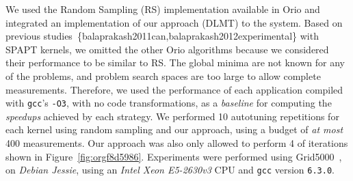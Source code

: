 \documentclass[conference]{IEEEtran}
\begin{document}
We used the Random Sampling (RS) implementation available in Orio and integrated
an implementation of our approach (DLMT) to the system. Based on previous
studies~\{balaprakash2011can,balaprakash2012experimental\} with SPAPT kernels,
we omitted the other Orio algorithms because we considered their performance to
be similar to RS. The global minima are not known for any of the problems, and
problem search spaces are too large to allow complete measurements. Therefore,
we used the performance of each application compiled with \texttt{gcc}'s
\texttt{-O3}, with no code transformations, as a \emph{baseline} for computing the
\emph{speedups} achieved by each strategy. We performed 10 autotuning repetitions for
each kernel using random sampling and our approach, using a budget of \emph{at most}
400 measurements. Our approach was also only allowed to perform 4 of iterations
shown in Figure~\ref{fig:orgf8d5986}. Experiments were performed using
Grid5000~\cite{balouek2013adding}, on \emph{Debian Jessie}, using an \emph{Intel
Xeon E5-2630v3} CPU and \texttt{gcc} version \texttt{6.3.0}.
\end{document}
